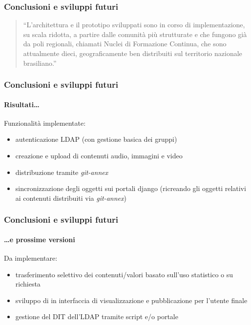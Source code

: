 \documentclass{beamer}
\begin{document}
\begin{frame}
 \frametitle{Conclusioni e sviluppi futuri}
  \begin{quote}
    ``L'architettura e il prototipo sviluppati sono in corso di
    implementazione, su scala ridotta, a partire dalle comunità più
    strutturate e che fungono già da poli regionali, chiamati Nuclei
    di Formazione Continua, che sono attualmente dieci,
    geograficamente ben distribuiti sul territorio nazionale
    brasiliano.''
  \end{quote}
\end{frame}

\begin{frame}
 \frametitle{Conclusioni e sviluppi futuri}
  \framesubtitle{Risultati\ldots}
  Funzionalità implementate:
  \begin{itemize}
  \item autenticazione LDAP (con gestione basica dei gruppi)
  \item creazione e upload di contenuti audio, immagini e video
  \item distribuzione tramite \emph{git-annex}
  \item sincronizzazione degli oggetti sui portali django (ricreando
    gli oggetti relativi ai contenuti distribuiti via
    \emph{git-annex})
  \end{itemize}
\end{frame}
  
\begin{frame}
 \frametitle{Conclusioni e sviluppi futuri}
  \framesubtitle{\ldots e prossime versioni}
 
  Da implementare:
  \begin{itemize}
  \item trasferimento selettivo dei contenuti/valori basato sull'uso
    statistico o su richiesta
  \item sviluppo di in interfaccia di visualizzazione e pubblicazione
    per l'utente finale
  \item gestione del DIT dell'LDAP tramite script e/o portale
  \end{itemize}
\end{frame}
\end{document}
